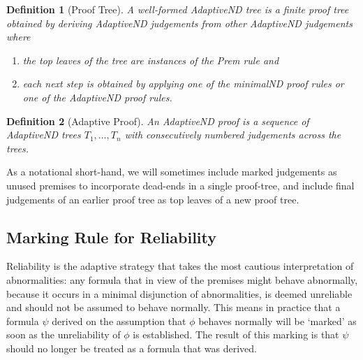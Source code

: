\documentclass[]{article}
\newtheorem{definition}{Definition}
\begin{document}
\begin{definition}[Proof Tree]
A well-formed {\sf AdaptiveND} tree is a finite proof tree obtained by deriving {\sf AdaptiveND} judgements from other {\sf AdaptiveND} judgements where
\begin{enumerate}

\item the top leaves of the tree are instances of the {\sf Prem} rule and
\item each next step is obtained by applying one of the {\sf minimalND} proof rules or one of the {\sf AdaptiveND} proof rules.
\end{enumerate}
\end{definition}

\begin{definition}[Adaptive Proof]
An {\sf AdaptiveND} proof is a sequence of {\sf AdaptiveND} trees $T_{1}, \dots, T_{n}$ with consecutively numbered judgements across the trees.
\end{definition}

As a notational short-hand, we will sometimes include marked judgements as unused premises to incorporate dead-ends in a single proof-tree, and include final judgements of an earlier proof tree as top leaves of a new proof tree.


\subsection{Marking Rule for Reliability}\label{sec:markrel}

Reliability is the adaptive strategy that takes the most cautious interpretation of abnormalities: any formula that in view of the premises might behave abnormally, because it occurs in a minimal disjunction of abnormalities, is deemed unreliable and should not be assumed to behave normally. This means in practice that a formula $\psi$ derived on the assumption that $\phi$ behaves normally will be `marked' as soon as the unreliability of $\phi$ is established. The result of this marking is that $\psi$ should no longer be treated as a formula that was derived.

\end{document}
